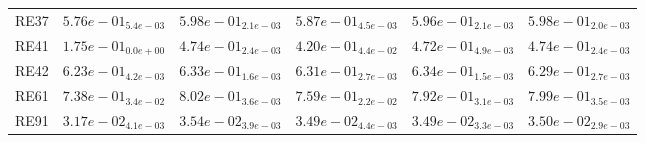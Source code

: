 \documentclass{article}
\begin{document}
\begin{table}
\begin{scriptsize}
\begin{tabular}{llllll}
RE37 & $  5.76e-01_{ 5.4e-03}$ & \cellcolor{gray95}$  5.98e-01_{ 2.1e-03}$ & $  5.87e-01_{ 4.5e-03}$ & $  5.96e-01_{ 2.1e-03}$ & \cellcolor{gray25}$  5.98e-01_{ 2.0e-03}$ \\
RE41 & $  1.75e-01_{ 0.0e+00}$ & \cellcolor{gray25}$  4.74e-01_{ 2.4e-03}$ & $  4.20e-01_{ 4.4e-02}$ & $  4.72e-01_{ 4.9e-03}$ & \cellcolor{gray95}$  4.74e-01_{ 2.4e-03}$ \\
RE42 & $  6.23e-01_{ 4.2e-03}$ & \cellcolor{gray25}$  6.33e-01_{ 1.6e-03}$ & $  6.31e-01_{ 2.7e-03}$ & \cellcolor{gray95}$  6.34e-01_{ 1.5e-03}$ & $  6.29e-01_{ 2.7e-03}$ \\
RE61 & $  7.38e-01_{ 3.4e-02}$ & \cellcolor{gray95}$  8.02e-01_{ 3.6e-03}$ & $  7.59e-01_{ 2.2e-02}$ & $  7.92e-01_{ 3.1e-03}$ & \cellcolor{gray25}$  7.99e-01_{ 3.5e-03}$ \\
RE91 & $  3.17e-02_{ 4.1e-03}$ & \cellcolor{gray95}$  3.54e-02_{ 3.9e-03}$ & $  3.49e-02_{ 4.4e-03}$ & $  3.49e-02_{ 3.3e-03}$ & \cellcolor{gray25}$  3.50e-02_{ 2.9e-03}$ \\
\hline
\end{tabular}
\end{scriptsize}
\end{table}
\end{document}
